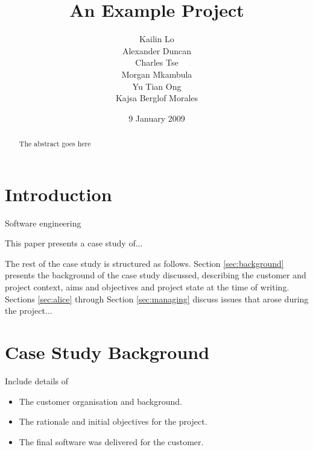 \documentclass{l3proj}
\begin{document}
\title{An Example Project}

\author{Kailin Lo \\
        Alexander Duncan \\
        Charles Tse \\
        Morgan Mkambula \\
        Yu Tian Ong \\
        Kajsa Berglof Morales}

\date{9 January 2009}

\maketitle

\begin{abstract}

The abstract goes here

\end{abstract}

\educationalconsent

\newpage

\section{Introduction}

Software engineering 

This paper presents a case study of... 


The rest of the case study is structured as follows.  Section
\ref{sec:background} presents the background of the case study
discussed, describing the customer and project context, aims and
objectives and project state at the time of writing.  Sections
\ref{sec:alice} through Section \ref{sec:managing} discuss issues that
arose during the project...

\section{Case Study Background}

Include details of 

\begin{itemize}
\item The customer organisation and background.
\item The rationale and initial objectives for the project.
\item The final software was delivered for the customer.
\end{itemize}
\end{document}
